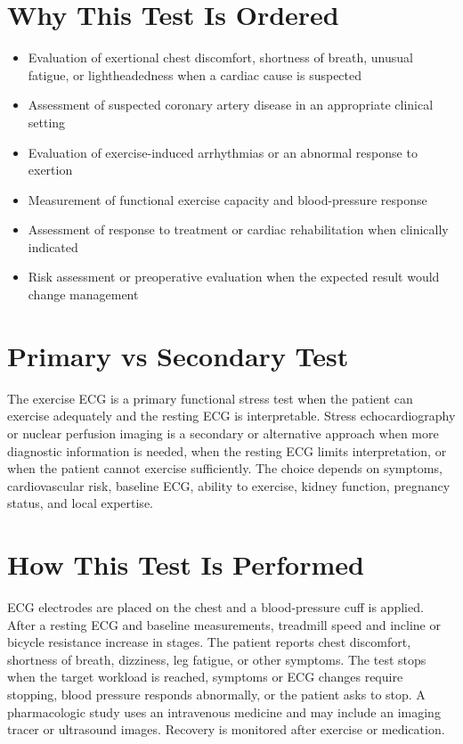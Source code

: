 \section*{Why This Test Is Ordered}
\begin{itemize}
  \item Evaluation of exertional chest discomfort, shortness of breath, unusual fatigue, or lightheadedness when a cardiac cause is suspected
  \item Assessment of suspected coronary artery disease in an appropriate clinical setting
  \item Evaluation of exercise-induced arrhythmias or an abnormal response to exertion
  \item Measurement of functional exercise capacity and blood-pressure response
  \item Assessment of response to treatment or cardiac rehabilitation when clinically indicated
  \item Risk assessment or preoperative evaluation when the expected result would change management
\end{itemize}

\section*{Primary vs Secondary Test}
The exercise ECG is a primary functional stress test when the patient can exercise adequately and the resting ECG is interpretable. Stress echocardiography or nuclear perfusion imaging is a secondary or alternative approach when more diagnostic information is needed, when the resting ECG limits interpretation, or when the patient cannot exercise sufficiently. The choice depends on symptoms, cardiovascular risk, baseline ECG, ability to exercise, kidney function, pregnancy status, and local expertise.

\section*{How This Test Is Performed}
ECG electrodes are placed on the chest and a blood-pressure cuff is applied. After a resting ECG and baseline measurements, treadmill speed and incline or bicycle resistance increase in stages. The patient reports chest discomfort, shortness of breath, dizziness, leg fatigue, or other symptoms. The test stops when the target workload is reached, symptoms or ECG changes require stopping, blood pressure responds abnormally, or the patient asks to stop. A pharmacologic study uses an intravenous medicine and may include an imaging tracer or ultrasound images. Recovery is monitored after exercise or medication.

